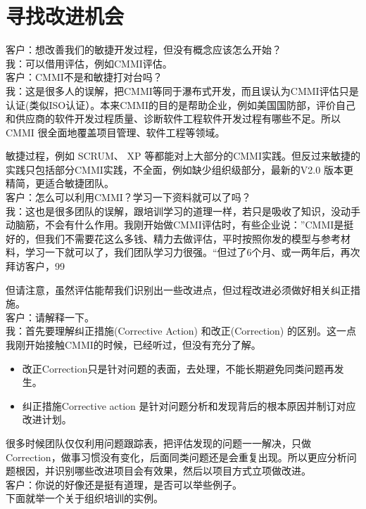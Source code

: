 \chapter{寻找改进机会} %

客户：想改善我们的敏捷开发过程，但没有概念应该怎么开始？\\
我：可以借用评估，例如CMMI评估。\\
客户：CMMI不是和敏捷打对台吗？\\
我：这是很多人的误解，把CMMI等同于瀑布式开发，而且误认为CMMI评估只是认证(类似ISO认证）。本来CMMI的目的是帮助企业，例如美国国防部，评价自己和供应商的软件开发过程质量、诊断软件工程软件开发过程有哪些不足。所以CMMI
很全面地覆盖项目管理、软件工程等领域。

敏捷过程，例如 SCRUM、 XP
等都能对上大部分的CMMI实践。但反过来敏捷的实践只包括部分CMMI实践，不全面，例如缺少组织级部分，最新的V2.0
版本更精简，更适合敏捷团队。\\

客户：怎么可以利用CMMI？学习一下资料就可以了吗？\\
我：这也是很多团队的误解，跟培训学习的道理一样，若只是吸收了知识，没动手动脑筋，不会有什么作用。我刚开始做CMMI评估时，有些企业说：”CMMI是挺好的，但我们不需要花这么多钱、精力去做评估，平时按照你发的模型与参考材料，学习一下就可以了，我们团队学习力很强。“但过了6个月、或一两年后，再次拜访客户，99%

但请注意，虽然评估能帮我们识别出一些改进点，但过程改进必须做好相关纠正措施。\\
客户：请解释一下。\\
我：首先要理解纠正措施(Corrective Action) 和改正(Correction) 的区别。这一点我刚开始接触CMMI的时候，已经听过，但没有充分了解。\\


\begin{itemize}
\tightlist
\item
  改正Correction只是针对问题的表面，去处理，不能长期避免同类问题再发生。
\item
  纠正措施Corrective action
   是针对问题分析和发现背后的根本原因并制订对应改进计划。
\end{itemize}

很多时候团队仅仅利用问题跟踪表，把评估发现的问题一一解决，只做Correction，做事习惯没有变化，后面同类问题还是会重复出现。所以更应分析问题根因，并识别哪些改进项目会有效果，然后以项目方式立项做改进。\\
客户：你说的好像还是挺有道理，是否可以举些例子。\\
下面就举一个关于组织培训的实例。\\

